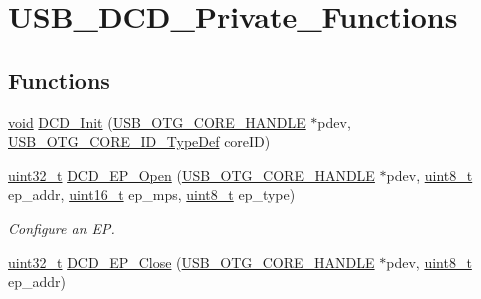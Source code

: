\hypertarget{group___u_s_b___d_c_d___private___functions}{\section{U\-S\-B\-\_\-\-D\-C\-D\-\_\-\-Private\-\_\-\-Functions}
\label{group___u_s_b___d_c_d___private___functions}
}
\subsection*{Functions}
\begin{DoxyCompactItemize}
\item 
\hyperlink{group___n_a_m_e_ga18028b8badbf1ea7e704ccac3c488e82}{void} \hyperlink{group___u_s_b___d_c_d___private___functions_ga32ea24db123f7f8bb0edfb4f97c1c892}{D\-C\-D\-\_\-\-Init} (\hyperlink{group___u_s_b___c_o_r_e___exported___types_gaf76054c11eb8a3367907aad7ae700e80}{U\-S\-B\-\_\-\-O\-T\-G\-\_\-\-C\-O\-R\-E\-\_\-\-H\-A\-N\-D\-L\-E} $\ast$pdev, \hyperlink{group___u_s_b___d_e_f_i_n_e_s___exported___types_gab31b9dd0bc08bf6120424c20bda8eb7e}{U\-S\-B\-\_\-\-O\-T\-G\-\_\-\-C\-O\-R\-E\-\_\-\-I\-D\-\_\-\-Type\-Def} core\-I\-D)
\item 
\hyperlink{stdint_8h_a435d1572bf3f880d55459d9805097f62}{uint32\-\_\-t} \hyperlink{group___u_s_b___d_c_d___private___functions_ga9d1aa06cfde8fe3442ab7486c6c5bbdd}{D\-C\-D\-\_\-\-E\-P\-\_\-\-Open} (\hyperlink{group___u_s_b___c_o_r_e___exported___types_gaf76054c11eb8a3367907aad7ae700e80}{U\-S\-B\-\_\-\-O\-T\-G\-\_\-\-C\-O\-R\-E\-\_\-\-H\-A\-N\-D\-L\-E} $\ast$pdev, \hyperlink{stdint_8h_aba7bc1797add20fe3efdf37ced1182c5}{uint8\-\_\-t} ep\-\_\-addr, \hyperlink{stdint_8h_a273cf69d639a59973b6019625df33e30}{uint16\-\_\-t} ep\-\_\-mps, \hyperlink{stdint_8h_aba7bc1797add20fe3efdf37ced1182c5}{uint8\-\_\-t} ep\-\_\-type)
\begin{DoxyCompactList}\small\item\em Configure an E\-P. \end{DoxyCompactList}\item 
\hyperlink{stdint_8h_a435d1572bf3f880d55459d9805097f62}{uint32\-\_\-t} \hyperlink{group___u_s_b___d_c_d___private___functions_ga6fdf047e0b91049b43d9cb2b1c39dcb8}{D\-C\-D\-\_\-\-E\-P\-\_\-\-Close} (\hyperlink{group___u_s_b___c_o_r_e___exported___types_gaf76054c11eb8a3367907aad7ae700e80}{U\-S\-B\-\_\-\-O\-T\-G\-\_\-\-C\-O\-R\-E\-\_\-\-H\-A\-N\-D\-L\-E} $\ast$pdev, \hyperlink{stdint_8h_aba7bc1797add20fe3efdf37ced1182c5}{uint8\-\_\-t} ep\-\_\-addr)

\end{DoxyCompactItemize}
